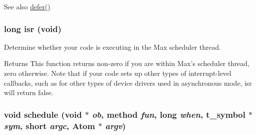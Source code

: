 \begin{DoxySeeAlso}{See also}
\hyperlink{group__threading_gaa24a0c9896f1ad241e45590065c3f643}{defer()} 
\end{DoxySeeAlso}
\hypertarget{group__threading_gad60dbceb5e50471a3ec76f608a9ea35c}{
\subsubsection[{isr}]{\setlength{\rightskip}{0pt plus 5cm}long isr (void)}}
\label{group__threading_gad60dbceb5e50471a3ec76f608a9ea35c}


Determine whether your code is executing in the Max scheduler thread. \begin{DoxyReturn}{Returns}
This function returns non-\/zero if you are within Max's scheduler thread, zero otherwise. Note that if your code sets up other types of interrupt-\/level callbacks, such as for other types of device drivers used in asynchronous mode, isr will return false. 
\end{DoxyReturn}
\hypertarget{group__threading_ga1eb8ec7623f0806dd079d7be708c19a8}{
\subsubsection[{schedule}]{\setlength{\rightskip}{0pt plus 5cm}void schedule (void $\ast$ {\em ob}, \/  {\bf method} {\em fun}, \/  long {\em when}, \/  {\bf t\_\-symbol} $\ast$ {\em sym}, \/  short {\em argc}, \/  Atom $\ast$ {\em argv})}}
\label{group__threading_ga1eb8ec7623f0806dd079d7be708c19a8}


